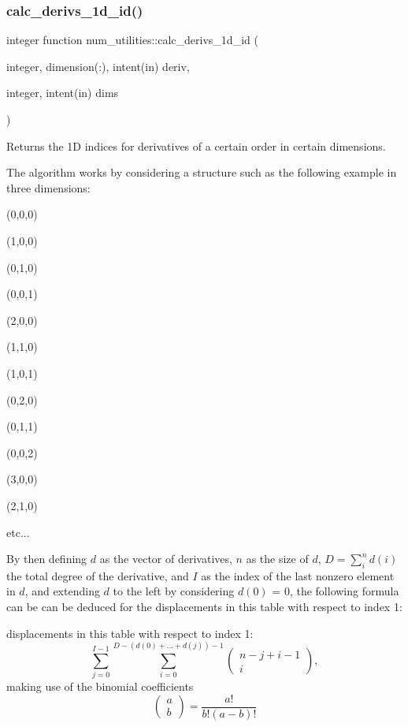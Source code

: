 \subsubsection{\texorpdfstring{calc\+\_\+derivs\+\_\+1d\+\_\+id()}{calc\_derivs\_1d\_id()}}
{\footnotesize\ttfamily integer function num\+\_\+utilities\+::calc\+\_\+derivs\+\_\+1d\+\_\+id (\begin{DoxyParamCaption}\item[{integer, dimension(\+:), intent(in)}]{deriv,  }\item[{integer, intent(in)}]{dims }\end{DoxyParamCaption})}



Returns the 1D indices for derivatives of a certain order in certain dimensions. 

The algorithm works by considering a structure such as the following example in three dimensions\+:
\begin{DoxyEnumerate}
\item (0,0,0)
\item (1,0,0)
\item (0,1,0)
\item (0,0,1)
\item (2,0,0)
\item (1,1,0)
\item (1,0,1)
\item (0,2,0)
\item (0,1,1)
\item (0,0,2)
\item (3,0,0)
\item (2,1,0)
\end{DoxyEnumerate}

etc...

By then defining $d$ as the vector of derivatives, $n$ as the size of $d$, $D = \sum_i^n d(i)$ the total degree of the derivative, and $I$ as the index of the last nonzero element in $d$, and extending $d$ to the left by considering $d(0)$ = 0, the following formula can be can be deduced for the displacements in this table with respect to index 1\+:

displacements in this table with respect to index 1\+: \[\sum_{j=0}^{I-1} \sum_{i=0}^ {D-(d(0)+...+d(j))-1} \left(\begin{array}{c}n-j+i-1\\i\end{array}\right) , \] making use of the binomial coefficients \[\left(\begin{array}{c}a\\b\end{array}\right) = \frac{a!}{b!(a-b)!}\]

